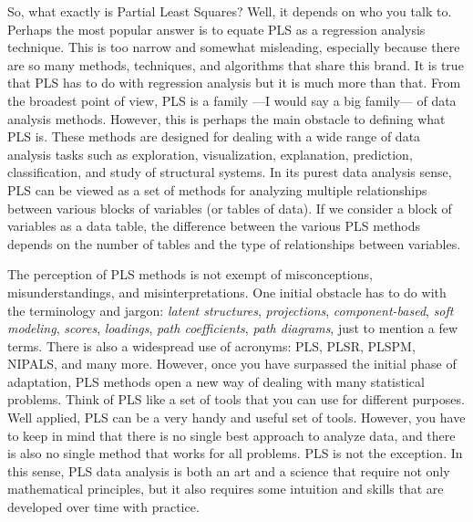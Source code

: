 \documentclass[12pt]{book}\usepackage{graphicx, color}
\begin{document}
So, what exactly is Partial Least Squares? Well, it depends on who you talk to. Perhaps the most popular answer is to equate PLS as a regression analysis technique. This is too narrow and somewhat misleading, especially because there are so many methods, techniques, and algorithms that share this brand. It is true that PLS has to do with regression analysis but it is much more than that. From the broadest point of view, PLS is a family ---I would say a big family--- of data analysis methods. However, this is perhaps the main obstacle to defining what PLS is. These methods are designed for dealing with a wide range of data analysis tasks such as exploration, visualization, explanation, prediction, classification, and study of structural systems. In its purest data analysis sense, PLS can be viewed as a set of methods for analyzing multiple relationships between various blocks of variables (or tables of data). If we consider a block of variables as a data table, the difference between the various PLS methods depends on the number of tables and the type of relationships between variables.

The perception of PLS methods is not exempt of misconceptions, misunderstandings, and misinterpretations. One initial obstacle has to do with the terminology and jargon: \textit{latent structures}, \textit{projections}, \textit{component-based}, \textit{soft modeling}, \textit{scores}, \textit{loadings}, \textit{path coefficients}, \textit{path diagrams}, just to mention a few terms. There is also a widespread use of acronyms: PLS, PLSR, PLSPM, NIPALS, and many more. However, once you have surpassed the initial phase of adaptation, PLS methods open a new way of dealing with many statistical problems. Think of PLS like a set of tools that you can use for different purposes. Well applied, PLS can be a very handy and useful set of tools. However, you have to keep in mind that there is no single best approach to analyze data, and there is also no single method that works for all problems. PLS is not the exception. In this sense, PLS data analysis is both an art and a science that require not only mathematical principles, but it also requires some intuition and skills that are developed over time with practice. 
\end{document}

